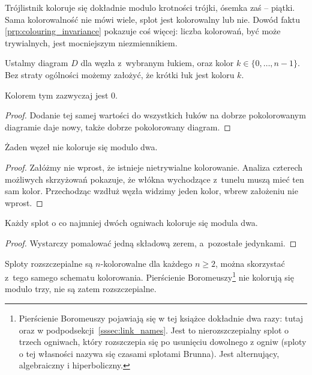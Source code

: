 Trójlistnik koloruje się dokładnie modulo krotności trójki, ósemka zaś -- piątki.
Sama kolorowalność nie mówi wiele, splot jest kolorowalny lub nie.
Dowód faktu \ref{prp:colouring_invariance} pokazuje coś więcej: liczba kolorowań, być może trywialnych, jest mocniejszym niezmiennikiem.

\begin{lemma}
\label{lem:colouring_arc}%
    Ustalmy diagram $D$ dla węzła z~wybranym łukiem, oraz kolor $k \in \{0, \ldots, n - 1\}$.
    Bez straty ogólności możemy założyć, że krótki łuk jest koloru $k$.
\end{lemma}

Kolorem tym zazwyczaj jest $0$.

\begin{proof}
    Dodanie tej samej wartości do wszystkich łuków na dobrze pokolorowanym diagramie daje nowy, także dobrze pokolorowany diagram.
\end{proof}

\begin{proposition}
\label{prp:no_colourings_mod_2}%
    Żaden węzeł nie koloruje się modulo dwa.
\end{proposition}

\begin{proof}
    Załóżmy nie wprost, że istnieje nietrywialne kolorowanie.
    Analiza czterech możliwych skrzyżowań pokazuje, że włókna wychodzące z~tunelu muszą mieć ten sam kolor.
    Przechodząc wzdłuż węzła widzimy jeden kolor, wbrew założeniu nie wprost.
\end{proof}

\begin{proposition}
    Każdy splot o co najmniej dwóch ogniwach koloruje się modula dwa.
\end{proposition}

\begin{proof}
    Wystarczy pomalować jedną składową zerem, a~pozostałe jedynkami.
\end{proof}

Sploty rozszczepialne są $n$-kolorowalne dla każdego $n \ge 2$, można skorzystać z~tego samego schematu kolorowania.
%
Pierścienie Boromeuszy\footnote{Pierścienie Boromeuszy pojawiają się w tej książce dokładnie dwa razy: tutaj oraz w podpodsekcji~\ref{sssec:link_names}. Jest to nierozszczepialny splot o trzech ogniwach, który rozszczepia się po usunięciu dowolnego z ogniw (sploty o tej własności nazywa się czasami splotami Brunna). Jest alternujący, algebraiczny i hiperboliczny.} nie kolorują się modulo trzy, nie są zatem rozszczepialne.
%

